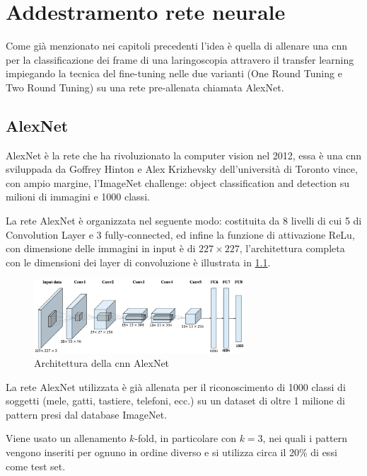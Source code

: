 \chapter{Addestramento rete neurale}\label{addestramento-rete-neurale}


Come già menzionato nei capitoli precedenti l’idea è quella di allenare una \gls{cnn} per la classificazione dei frame di una laringoscopia attravero il transfer learning impiegando la tecnica del
fine-tuning nelle due varianti (One Round Tuning e Two Round Tuning)  su una rete pre-allenata chiamata AlexNet.

\section{AlexNet}\label{alexnet}
AlexNet è la rete che ha rivoluzionato la computer vision nel 2012, essa è una \gls{cnn} sviluppada
da Goffrey Hinton e Alex Krizhevsky dell’università di Toronto vince, con ampio margine, 
l’ImageNet challenge: object classification and detection su milioni di immagini e 1000 classi.

La rete AlexNet è organizzata nel seguente modo: costituita da 8 livelli di cui 5 di \gls{Convolution Layer} e 3 \gls{fully-connected}, ed infine la funzione
di attivazione \gls{ReLu}, con dimensione delle immagini in input è di \(227\times 227\), l'architettura completa con le dimensioni dei layer di \gls{convoluzione} è illustrata in \cref{fig:alexnet}\cite{alexnet}.  

\begin{figure}[ht]
    \centering
    \includegraphics[width=0.7\textwidth]{addestramento-rete-neurale/alexnet.png}
    \caption{Architettura della \gls{cnn} AlexNet}
    \label{fig:alexnet}
\end{figure}

La rete AlexNet utilizzata è già allenata per il riconoscimento di 1000 classi di soggetti (mele, gatti, tastiere, telefoni, ecc.) su un dataset di oltre 1 milione di pattern presi dal database ImageNet\cite{alexnet}.

Viene usato un allenamento \(k\)-fold, in particolare con \(k=3\), nei quali i pattern vengono inseriti per ognuno in
ordine diverso e si utilizza circa il 20\% di essi come test set.

